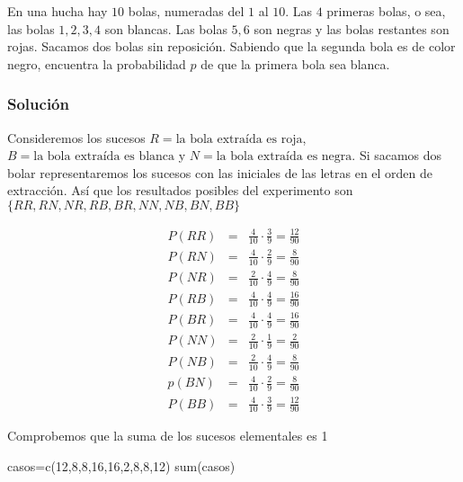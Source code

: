 \documentclass[
]{article}
\newenvironment{Shaded}{\begin{snugshade}}{\end{snugshade}}
\newcommand{\DecValTok}[1]{\textcolor[rgb]{0.00,0.00,0.81}{#1}}
\newcommand{\FunctionTok}[1]{\textcolor[rgb]{0.00,0.00,0.00}{#1}}
\newcommand{\NormalTok}[1]{#1}
\newcommand{\OtherTok}[1]{\textcolor[rgb]{0.56,0.35,0.01}{#1}}
\begin{document}
En una hucha hay \(10\) bolas, numeradas del \(1\) al \(10\). Las \(4\)
primeras bolas, o sea, las bolas \(1,2,3,4\) son blancas. Las bolas
\(5,6\) son negras y las bolas restantes son rojas. Sacamos dos bolas
sin reposición. Sabiendo que la segunda bola es de color negro,
encuentra la probabilidad \(p\) de que la primera bola sea blanca.

\hypertarget{soluciuxf3n-14}{%
\subsubsection{Solución}\label{soluciuxf3n-14}}

Consideremos los sucesos \(R=\mbox{la bola extraída es roja}\),
\(B=\mbox{la bola extraída es blanca}\) y
\(N=\mbox{la bola extraída es negra}\). Si sacamos dos bolar
representaremos los sucesos con las iniciales de las letras en el orden
de extracción. Así que los resultados posibles del experimento son
\(\{RR,RN,NR,RB,BR,NN,NB,BN,BB\}\)

\begin{eqnarray*}
P(RR)&=&\frac{4}{10}\cdot \frac{3}{9}=\frac{12}{90}
\\ P(RN)&=&\frac{4}{10}\cdot \frac{2}{9}=\frac{8}{90}
\\ P(NR)&=&\frac{2}{10}\cdot \frac{4}{9}=\frac{8}{90}
\\  P(RB)&=&\frac{4}{10}\cdot \frac{4}{9}=\frac{16}{90}
\\  P(BR)&=&\frac{4}{10}\cdot \frac{4}{9}=\frac{16}{90}
\\  P(NN)&=&\frac{2}{10}\cdot \frac{1}{9}=\frac{2}{90}
\\  P(NB)&=&\frac{2}{10}\cdot \frac{4}{9}=\frac{8}{90}
\\  p(BN)&=&\frac{4}{10}\cdot \frac{2}{9}=\frac{8}{90}
\\  P(BB)&=&\frac{4}{10}\cdot \frac{3}{9}=\frac{12}{90}
\end{eqnarray*}

Comprobemos que la suma de los sucesos elementales es 1

\begin{Shaded}
\begin{Highlighting}[]
\NormalTok{casos}\OtherTok{=}\FunctionTok{c}\NormalTok{(}\DecValTok{12}\NormalTok{,}\DecValTok{8}\NormalTok{,}\DecValTok{8}\NormalTok{,}\DecValTok{16}\NormalTok{,}\DecValTok{16}\NormalTok{,}\DecValTok{2}\NormalTok{,}\DecValTok{8}\NormalTok{,}\DecValTok{8}\NormalTok{,}\DecValTok{12}\NormalTok{)}
\FunctionTok{sum}\NormalTok{(casos)}
\end{Highlighting}
\end{Shaded}
\end{document}
